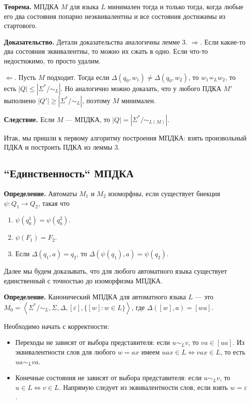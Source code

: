 \QED

\textbf{Теорема.} МПДКА $M$ для языка $L$ минимален тогда и только тогда, когда любые его два состояния попарно неэквивалентны и все состояния достижимы из стартового.

\textbf{Доказательство.} Детали доказательства аналогичны лемме 3.
$\Rightarrow$. Если какие-то два состояния эквивалентны, то можно их сжать в одно. Если что-то недостижимо, то просто удалим.

$\Leftarrow$. Пусть $M$ подходит. Тогда если $\Delta(q_0, w_1) \ne \Delta(q_0, w_2)$, то $w_1 \not\sim_L w_2$, то есть $|Q| \le |\Sigma^*/\sim_L|$.
Но аналогично можно доказать, что у любого ПДКА $M'$ выполнено $|Q'| \ge |\Sigma^*/\sim_L|$, поэтому $M$ минимален.

\QED

\textbf{Следствие.} Если $M$ --- МПДКА, то $|Q| = |\Sigma^*/\sim_{L(M)}|$.

Итак, мы пришли к первому алгоритму построения МПДКА: взять произвольный ПДКА и построить ПДКА из леммы 3.

\subsection{``Единственность`` МПДКА}
\textbf{Определение.} Автоматы $M_1$ и $M_2$ изоморфны, если существует биекция $\psi: Q_1 \to Q_2$, такая что 
\begin{enumerate}
    \item $\psi(q_0^1) = \psi(q_0^2)$.
    \item $\psi(F_1) = F_2$.
    \item Если $\Delta(q_1, a) = q_2$, то $\Delta(\psi(q_1), a) = \psi(q_2)$.
\end{enumerate}
Далее мы будем доказывать, что для любого автоматного языка существует единственный с точностью до изоморфизма МПДКА.

\textbf{Определение.} Канонический МПДКА для автоматного языка $L$ --- это $M_0 = \left< \Sigma^*/\sim_L, \Sigma, \Delta, [\varepsilon], \{[w]: w \in L \}\right>$, где $\Delta([w], a) = [wa]$.

Необходимо начать с корректности:
\begin{itemize}
    \item Переходы не зависят от выбора представителя: если $u \sim_L v$, то $va \in [ua]$.
        Из эквивалентности слов для любого $w = ax$ имеем $uax \in L \iff vax \in L$, то есть $ua \sim_L va$.

    \item Конечные состояния не зависят от выбора представителя: если $u \sim_L v$, то $u \in L \iff v \in L$.
        Напрямую следует из эквивалентности слов, если взять $w = \varepsilon$.
\end{itemize}

